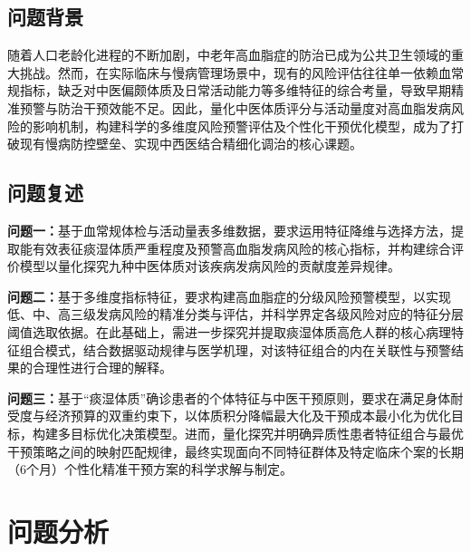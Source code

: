 \documentclass[12pt]{article}
\begin{document}
	\subsection{问题背景}
	{\songti{}
		随着人口老龄化进程的不断加剧，中老年高血脂症的防治已成为公共卫生领域的重大挑战。然而，在实际临床与慢病管理场景中，现有的风险评估往往单一依赖血常规指标，缺乏对中医偏颇体质及日常活动能力等多维特征的综合考量，导致早期精准预警与防治干预效能不足。因此，量化中医体质评分与活动量度对高血脂发病风险的影响机制，构建科学的多维度风险预警评估及个性化干预优化模型，成为了打破现有慢病防控壁垒、实现中西医结合精细化调治的核心课题。\par}
	
	\subsection{问题复述}
	{\songti{}
		\textbf{问题一：}基于血常规体检与活动量表多维数据，要求运用特征降维与选择方法，提取能有效表征痰湿体质严重程度及预警高血脂发病风险的核心指标，并构建综合评价模型以量化探究九种中医体质对该疾病发病风险的贡献度差异规律。
		
		\textbf{问题二：}基于多维度指标特征，要求构建高血脂症的分级风险预警模型，以实现低、中、高三级发病风险的精准分类与评估，并科学界定各级风险对应的特征分层阈值选取依据。在此基础上，需进一步探究并提取痰湿体质高危人群的核心病理特征组合模式，结合数据驱动规律与医学机理，对该特征组合的内在关联性与预警结果的合理性进行合理的解释。
		
		\textbf{问题三：}基于“痰湿体质”确诊患者的个体特征与中医干预原则，要求在满足身体耐受度与经济预算的双重约束下，以体质积分降幅最大化及干预成本最小化为优化目标，构建多目标优化决策模型。进而，量化探究并明确异质性患者特征组合与最优干预策略之间的映射匹配规律，最终实现面向不同特征群体及特定临床个案的长期（6个月）个性化精准干预方案的科学求解与制定。\par}
	
	\section{问题分析}
\end{document}
